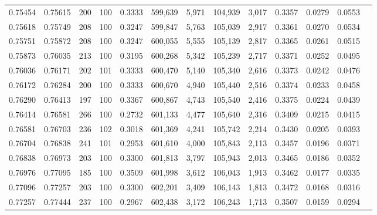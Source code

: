 \begin{tabular}{rrrrrrrrrrrrr}
0.75454 & 0.75615 &   200 & 100 &                                     0.3333 & 599,639 &   5,971 & 104,939 &   3,017 & 0.3357 & 0.0279 & 0.0553 \\
0.75618 & 0.75749 &   208 & 100 &                                     0.3247 & 599,847 &   5,763 & 105,039 &   2,917 & 0.3361 & 0.0270 & 0.0534 \\
0.75751 & 0.75872 &   208 & 100 &                                     0.3247 & 600,055 &   5,555 & 105,139 &   2,817 & 0.3365 & 0.0261 & 0.0515 \\
0.75873 & 0.76035 &   213 & 100 &                                     0.3195 & 600,268 &   5,342 & 105,239 &   2,717 & 0.3371 & 0.0252 & 0.0495 \\
0.76036 & 0.76171 &   202 & 101 &                                     0.3333 & 600,470 &   5,140 & 105,340 &   2,616 & 0.3373 & 0.0242 & 0.0476 \\
0.76172 & 0.76284 &   200 & 100 &                                     0.3333 & 600,670 &   4,940 & 105,440 &   2,516 & 0.3374 & 0.0233 & 0.0458 \\
0.76290 & 0.76413 &   197 & 100 &                                     0.3367 & 600,867 &   4,743 & 105,540 &   2,416 & 0.3375 & 0.0224 & 0.0439 \\
0.76414 & 0.76581 &   266 & 100 &                                     0.2732 & 601,133 &   4,477 & 105,640 &   2,316 & 0.3409 & 0.0215 & 0.0415 \\
0.76581 & 0.76703 &   236 & 102 &                                     0.3018 & 601,369 &   4,241 & 105,742 &   2,214 & 0.3430 & 0.0205 & 0.0393 \\
0.76704 & 0.76838 &   241 & 101 &                                     0.2953 & 601,610 &   4,000 & 105,843 &   2,113 & 0.3457 & 0.0196 & 0.0371 \\
0.76838 & 0.76973 &   203 & 100 &                                     0.3300 & 601,813 &   3,797 & 105,943 &   2,013 & 0.3465 & 0.0186 & 0.0352 \\
0.76976 & 0.77095 &   185 & 100 &                                     0.3509 & 601,998 &   3,612 & 106,043 &   1,913 & 0.3462 & 0.0177 & 0.0335 \\
0.77096 & 0.77257 &   203 & 100 &                                     0.3300 & 602,201 &   3,409 & 106,143 &   1,813 & 0.3472 & 0.0168 & 0.0316 \\
0.77257 & 0.77444 &   237 & 100 &                                     0.2967 & 602,438 &   3,172 & 106,243 &   1,713 & 0.3507 & 0.0159 & 0.0294 \\

\end{tabular}
